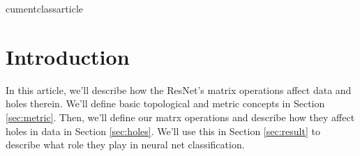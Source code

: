 
cumentclass{article}

\usepackage[margin=1in]{geometry}
\usepackage{amsmath, amssymb, amsthm}
\usepackage{mathtools}


\usepackage[round]{natbib}   %


\usepackage{hyperref}
\hypersetup{
  colorlinks   = true, %
  urlcolor     = blue, %
  linkcolor    = blue, %
  citecolor    = blue  %
}

\newtheorem{claim}{Claim}
\newtheorem{corollary}{Corollary}
\newtheorem{definition}{Definition}
\newtheorem{example}{Example}
\newtheorem{lemma}{Lemma}
\newtheorem{question}{Question}
\newtheorem{theorem}{Theorem}

\DeclareMathOperator*{\argmin}{arg\,min}
\DeclareMathOperator*{\argmax}{arg\,max}
\DeclareMathOperator*{\vecspan}{span}
\DeclareMathOperator*{\affspan}{aff}
\DeclareMathOperator*{\subG}{subG}
\DeclareMathOperator*{\tr}{tr}
\DeclareMathOperator*{\E}{\mathbb{E}}

\newcommand{\str}[1]{\texttt{#1}}
\newcommand{\defn}[1]{\textit{#1}}

\newcommand{\N}{\mathbb{N}}
\newcommand{\R}{\mathbb{R}}
\newcommand{\trans}[1]{{#1}^{\top}}

\newcommand{\abs}[1]{\lvert{#1}\rvert}
\newcommand{\ltwo}[1]{\lVert {#1} \rVert_2}

\newcommand{\w}{\mathbf w}
\newcommand{\what}{\hat\w}
\newcommand{\x}{\mathbf{x}}
\newcommand{\y}{y}

\newcommand{\relu}{\sigma}

\newcommand{\ignore}[1]{}
\newcommand{\fixme}[1]{\textcolor{red}{\textbf{FIXME:} {#1}}}



\section{Introduction}\label{sec:intro}
In this article, we'll describe how the ResNet's matrix operations affect data and holes therein.
We'll define basic topological and metric concepts in Section \ref{sec:metric}.
Then, we'll define our matrx operations and describe how they affect holes in data in Section \ref{sec:holes}.
We'll use this in Section \ref{sec:result} to describe what role they play in neural net classification.

